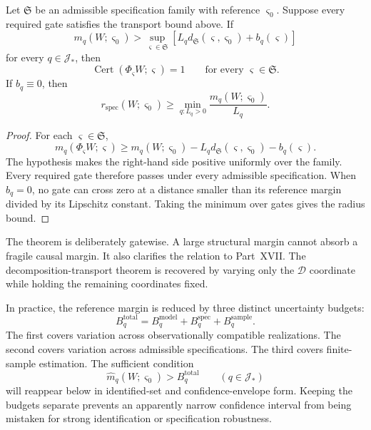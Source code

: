 
\begin{theorem}
\label{thm:specification-transport}
Let \(\mathfrak S\) be an admissible specification family with reference
\(\varsigma_0\). Suppose every required gate satisfies the transport bound
above. If
\[
\boxed{
 m_q(W;\varsigma_0)
>
\sup_{\varsigma\in\mathfrak S}
\left[
L_qd_{\mathfrak S}(\varsigma,\varsigma_0)
+b_q(\varsigma)
\right]
}
\]
for every \(q\in\mathcal J_*\), then
\[
\operatorname{Cert}(\Phi_{\varsigma}W;\varsigma)=1
\qquad
\text{for every }\varsigma\in\mathfrak S.
\]
If \(b_q\equiv0\), then
\[
\boxed{
r_{\mathrm{spec}}(W;\varsigma_0)
\geq
\min_{q:L_q>0}
\frac{m_q(W;\varsigma_0)}{L_q}.
}
\]
\end{theorem}

\begin{proof}
For each \(\varsigma\in\mathfrak S\),
\[
m_q(\Phi_{\varsigma}W;\varsigma)
\geq
m_q(W;\varsigma_0)
-L_qd_{\mathfrak S}(\varsigma,\varsigma_0)
-b_q(\varsigma).
\]
The hypothesis makes the right-hand side positive uniformly over the family.
Every required gate therefore passes under every admissible specification.
When \(b_q=0\), no gate can cross zero at a distance smaller than its reference
margin divided by its Lipschitz constant. Taking the minimum over gates gives
the radius bound.
\end{proof}

The theorem is deliberately gatewise. A large structural margin cannot absorb
a fragile causal margin. It also clarifies the relation to Part~XVII. The
decomposition-transport theorem is recovered by varying only the
\(\mathcal D\) coordinate while holding the remaining coordinates fixed.


In practice, the reference margin is reduced by three distinct uncertainty
budgets:
\[
\boxed{
B_q^{\mathrm{total}}
=
B_q^{\mathrm{model}}
+B_q^{\mathrm{spec}}
+B_q^{\mathrm{sample}}.
}
\]
The first covers variation across observationally compatible realizations. The
second covers variation across admissible specifications. The third covers
finite-sample estimation. The sufficient condition
\[
\widehat m_q(W;\varsigma_0)
>
B_q^{\mathrm{total}}
\qquad(q\in\mathcal J_*)
\]
will reappear below in identified-set and confidence-envelope form. Keeping the
budgets separate prevents an apparently narrow confidence interval from being
mistaken for strong identification or specification robustness.

